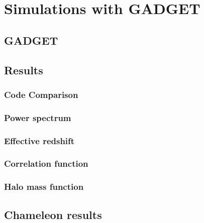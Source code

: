 \chapter{Simulations with GADGET}

\section{GADGET}

\section{Results}

\subsection{Code Comparison}

\subsection{Power spectrum}

\subsection{Effective redshift}

\subsection{Correlation function}

\subsection{Halo mass function}

\section{Chameleon results}
